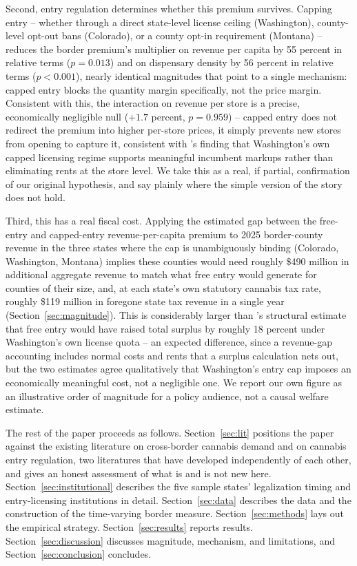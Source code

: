 \documentclass[12pt]{article}
\begin{document}
Second, entry regulation determines whether this premium survives. Capping entry -- whether through a direct
state-level license ceiling (Washington), county-level opt-out bans (Colorado), or a county opt-in requirement
(Montana) -- reduces the border premium's multiplier on revenue per capita by 55 percent in relative terms
($p=0.013$) and on dispensary density by 56 percent in relative terms ($p<0.001$), nearly identical magnitudes
that point to a single mechanism: capped entry blocks the quantity margin specifically, not the price margin.
Consistent with this, the interaction on revenue per store is a precise, economically negligible null ($+1.7$
percent, $p=0.959$) -- capped entry does not redirect the premium into higher per-store prices, it simply
prevents new stores from opening to capture it, consistent with \citet{HollenbeckUetake2021}'s finding that
Washington's own capped licensing regime supports meaningful incumbent markups rather than eliminating rents
at the store level. We take this as a real, if partial, confirmation of our original hypothesis, and say
plainly where the simple version of the story does not hold.

Third, this has a real fiscal cost. Applying the estimated gap between the free-entry and capped-entry
revenue-per-capita premium to 2025 border-county revenue in the three states where the cap is unambiguously
binding (Colorado, Washington, Montana) implies these counties would need roughly \$490 million in additional
aggregate revenue to match what free entry would generate for counties of their size, and, at each state's own
statutory cannabis tax rate, roughly \$119 million in foregone state tax revenue in a single year
(Section~\ref{sec:magnitude}). This is considerably larger than \citet{Thomas2019LicenseQuotas}'s structural
estimate that free entry would have raised total surplus by roughly 18 percent under Washington's own license
quota -- an expected difference, since a revenue-gap accounting includes normal costs and rents that a surplus
calculation nets out, but the two estimates agree qualitatively that Washington's entry cap imposes an
economically meaningful cost, not a negligible one. We report our own figure as an illustrative order of
magnitude for a policy audience, not a causal welfare estimate.

The rest of the paper proceeds as follows. Section~\ref{sec:lit} positions the paper against the existing
literature on cross-border cannabis demand and on cannabis entry regulation, two literatures that have
developed independently of each other, and gives an honest assessment of what is and is not new here.
Section~\ref{sec:institutional} describes the five sample states' legalization timing and entry-licensing
institutions in detail. Section~\ref{sec:data} describes the data and the construction of the time-varying
border measure. Section~\ref{sec:methods} lays out the empirical strategy. Section~\ref{sec:results} reports
results. Section~\ref{sec:discussion} discusses magnitude, mechanism, and limitations, and
Section~\ref{sec:conclusion} concludes.
\end{document}
